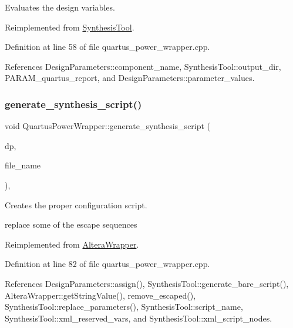 Evaluates the design variables. 



Reimplemented from \hyperlink{classSynthesisTool_a4304fdb0a60f1d8da1212568ae3bb031}{Synthesis\+Tool}.



Definition at line 58 of file quartus\+\_\+power\+\_\+wrapper.\+cpp.



References Design\+Parameters\+::component\+\_\+name, Synthesis\+Tool\+::output\+\_\+dir, P\+A\+R\+A\+M\+\_\+quartus\+\_\+report, and Design\+Parameters\+::parameter\+\_\+values.

\mbox{\label{classQuartusPowerWrapper_acc54508e1f8e353e48faae4e6aeed5de}} 
\subsubsection{\texorpdfstring{generate\+\_\+synthesis\+\_\+script()}{generate\_synthesis\_script()}}
{\footnotesize\ttfamily void Quartus\+Power\+Wrapper\+::generate\+\_\+synthesis\+\_\+script (\begin{DoxyParamCaption}\item[{const \hyperlink{DesignParameters_8hpp_ae36bb1c4c9150d0eeecfe1f96f42d157}{Design\+Parameters\+Ref} \&}]{dp,  }\item[{const std\+::string \&}]{file\+\_\+name }\end{DoxyParamCaption})\hspace{0.3cm}{\ttfamily [override]}, {\ttfamily [virtual]}}



Creates the proper configuration script. 

replace some of the escape sequences 

Reimplemented from \hyperlink{classAlteraWrapper_adf412338b1dab2382e24b261cbe6c216}{Altera\+Wrapper}.



Definition at line 82 of file quartus\+\_\+power\+\_\+wrapper.\+cpp.



References Design\+Parameters\+::assign(), Synthesis\+Tool\+::generate\+\_\+bare\+\_\+script(), Altera\+Wrapper\+::get\+String\+Value(), remove\+\_\+escaped(), Synthesis\+Tool\+::replace\+\_\+parameters(), Synthesis\+Tool\+::script\+\_\+name, Synthesis\+Tool\+::xml\+\_\+reserved\+\_\+vars, and Synthesis\+Tool\+::xml\+\_\+script\+\_\+nodes.

